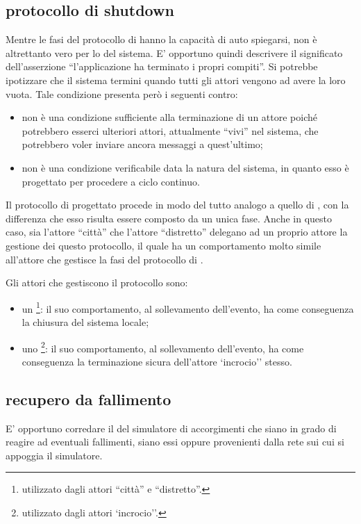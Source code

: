\subsection*{protocollo di shutdown}
Mentre le fasi del protocollo di  hanno la capacità di auto spiegarsi, non è altrettanto vero per lo  del sistema. E' opportuno quindi descrivere il significato dell'asserzione ``l'applicazione ha terminato i propri compiti''. Si potrebbe ipotizzare che il sistema termini quando tutti gli attori vengono ad avere la loro  vuota. Tale condizione presenta però i seguenti contro:

\begin{itemize}
\item{non è una condizione sufficiente alla terminazione di un attore poiché potrebbero esserci ulteriori attori, attualmente ``vivi'' nel sistema, che potrebbero voler inviare ancora messaggi a quest'ultimo;}
\item{non è una condizione verificabile data la natura del sistema, in quanto esso è progettato per procedere a ciclo continuo.}
\end{itemize} 

Il protocollo di  progettato procede in modo del tutto analogo a quello di , con la differenza che esso risulta essere composto da un unica fase. Anche in questo caso, sia l'attore ``città'' che l'attore ``distretto'' delegano ad un proprio attore la gestione dei questo protocollo, il quale ha un comportamento molto simile all'attore che gestisce la fasi del protocollo di .

Gli attori che gestiscono il protocollo sono:

\begin{itemize}
\item{un \footnote{utilizzato dagli attori ``città'' e ``distretto''.}: il suo comportamento, al sollevamento dell'evento, ha come conseguenza la chiusura del sistema locale;}
\item{uno \footnote{utilizzato dagli attori `incrocio''.}: il suo comportamento, al sollevamento dell'evento, ha come conseguenza la terminazione sicura dell'attore `incrocio'' stesso.}
\end{itemize}

\subsection*{recupero da fallimento}
\label{analisi-della-soluzione-distribuzione-recupero-da-fallimento}
E' opportuno corredare il  del simulatore di accorgimenti  che siano in grado di reagire ad eventuali fallimenti, siano essi  oppure provenienti dalla rete sui cui si appoggia il simulatore.

